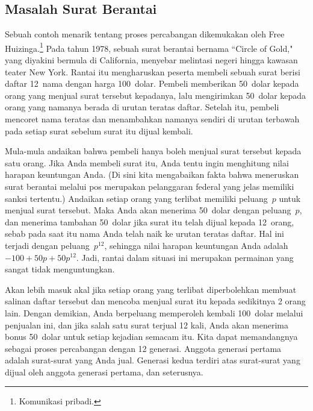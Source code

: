 \subsection*{Masalah Surat Berantai}
\begin{example}\label{exam 10.2.5}
Sebuah contoh menarik tentang proses percabangan dikemukakan oleh Free
Huizinga.\footnote{Komunikasi pribadi.}  Pada tahun 1978, sebuah surat
berantai bernama ``Circle of Gold," yang diyakini
bermula di California, menyebar melintasi negeri hingga kawasan teater New
York.  Rantai itu mengharuskan peserta membeli sebuah surat berisi daftar 12~nama dengan harga
100~dolar.  Pembeli memberikan 50~dolar kepada orang yang menjual surat tersebut kepadanya, lalu
mengirimkan 50~dolar kepada orang yang namanya berada di urutan teratas daftar.  Setelah itu,
pembeli mencoret nama teratas dan menambahkan namanya sendiri di urutan
terbawah pada setiap surat sebelum surat itu dijual kembali.

Mula-mula andaikan bahwa pembeli hanya boleh menjual surat tersebut kepada satu
orang.  Jika Anda membeli surat itu, Anda tentu ingin menghitung nilai harapan
keuntungan Anda.  (Di sini kita mengabaikan fakta bahwa meneruskan surat berantai
melalui pos merupakan pelanggaran federal yang jelas memiliki
sanksi tertentu.)  Andaikan setiap orang yang terlibat memiliki peluang~$p$ untuk menjual
surat tersebut.  Maka Anda akan menerima 50~dolar dengan peluang~$p$, dan menerima tambahan
50~dolar jika surat itu telah dijual kepada 12~orang, sebab pada saat itu nama Anda telah
naik ke urutan teratas daftar.  Hal ini terjadi dengan peluang~$p^{12}$, sehingga
nilai harapan keuntungan Anda adalah $-100 + 50p + 50p^{12}$.  Jadi, rantai dalam
situasi ini merupakan permainan yang sangat tidak menguntungkan.

Akan lebih masuk akal jika setiap orang yang terlibat diperbolehkan membuat salinan
daftar tersebut dan mencoba menjual surat itu kepada sedikitnya 2 orang lain.  Dengan demikian,
Anda berpeluang memperoleh kembali 100~dolar melalui penjualan ini, dan jika salah satu
surat terjual 12 kali, Anda akan menerima bonus 50~dolar untuk setiap
kejadian semacam itu.  Kita dapat memandangnya sebagai proses percabangan dengan 12 generasi.
Anggota generasi pertama adalah surat-surat yang Anda jual.  Generasi kedua
terdiri atas surat-surat yang dijual oleh anggota generasi pertama, dan
seterusnya.


\end{example}
